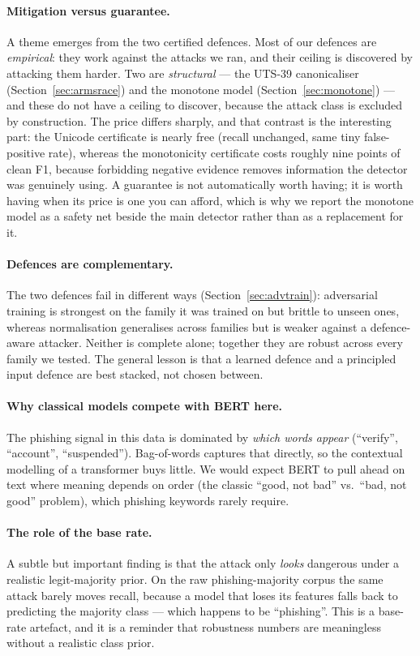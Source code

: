 \documentclass[11pt]{article}
\begin{document}
\paragraph{Mitigation versus guarantee.} A theme emerges from the two certified defences. Most of our
defences are \emph{empirical}: they work against the attacks we ran, and their ceiling is discovered by
attacking them harder. Two are \emph{structural} --- the UTS-39 canonicaliser
(Section~\ref{sec:armsrace}) and the monotone model (Section~\ref{sec:monotone}) --- and these do not
have a ceiling to discover, because the attack class is excluded by construction. The price differs
sharply, and that contrast is the interesting part: the Unicode certificate is nearly free (recall
unchanged, same tiny false-positive rate), whereas the monotonicity certificate costs roughly nine
points of clean F1, because forbidding negative evidence removes information the detector was genuinely
using. A guarantee is not automatically worth having; it is worth having when its price is one you can
afford, which is why we report the monotone model as a safety net beside the main detector rather than
as a replacement for it.

\paragraph{Defences are complementary.} The two defences fail in different ways
(Section~\ref{sec:advtrain}): adversarial training is strongest on the family it was
trained on but brittle to unseen ones, whereas normalisation generalises across
families but is weaker against a defence-aware attacker. Neither is complete alone;
together they are robust across every family we tested. The general lesson is that a
learned defence and a principled input defence are best stacked, not chosen between.

\paragraph{Why classical models compete with BERT here.} The phishing signal in this
data is dominated by \emph{which words appear} (``verify'', ``account'',
``suspended''). Bag-of-words captures that directly, so the contextual modelling of
a transformer buys little. We would expect BERT to pull ahead on text where meaning
depends on order (the classic ``good, not bad'' vs.\ ``bad, not good'' problem),
which phishing keywords rarely require.

\paragraph{The role of the base rate.} A subtle but important finding is that the
attack only \emph{looks} dangerous under a realistic legit-majority prior. On the
raw phishing-majority corpus the same attack barely moves recall, because a model
that loses its features falls back to predicting the majority class --- which happens
to be ``phishing''. This is a base-rate artefact, and it is a reminder that
robustness numbers are meaningless without a realistic class prior.
\end{document}

